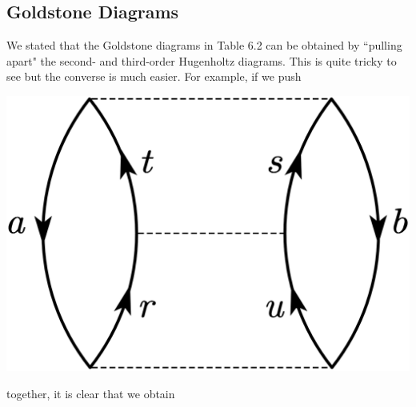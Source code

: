 \documentclass[a4paper]{book}
\newcounter{exercise}[chapter]
\begin{document}
	\subsection{Goldstone Diagrams}
	
	\begin{exercise}
	We stated that the Goldstone diagrams in Table 6.2 can be obtained by ``pulling apart" the second- and third-order Hugenholtz diagrams. This is quite tricky to see but the converse is much easier. For example, if we push
	
	\begin{center}
	\includegraphics[scale=0.9]{./pictures/6.12/exercise_1.png}
	\end{center}
	
	together, it is clear that we obtain
	

\end{exercise}
\end{document}

